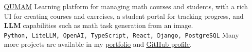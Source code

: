 \documentclass[8pt]{developercv} %
\begin{document}
\begin{entrylist}
    \entry
		{\phantom}
		{\underline{\href{https://qumam.edu.pl}{QUMAM}}}
		{}
		{Learning platform for managing math courses and students, with a rich UI for creating courses and exercises, a student portal for tracking progress, and \textbf{LLM} capabilities such as math task generation from an image.\\[2mm]
        \texttt{Python, LiteLLM, OpenAI, TypeScript, React, Django, PostgreSQL}}
    \entry
		{}
		{\vspace{-3mm}}
		{}
		{Many more projects are available in my \underline{\href{https://lukasz.leszko.dev/}{portfolio}} and \underline{\href{https://github.com/leszkolukasz}{GitHub profile}}.}
\end{entrylist}
\end{document}

